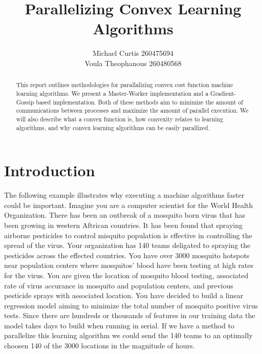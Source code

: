\documentclass{article}
\begin{document}
\title{Parallelizing Convex Learning Algorithms}
\author{Michael Curtis 260475694\\
Voula Theophanous 260480568}
\maketitle

\begin{abstract}

This report outlines methodologies for parallalizing convex cost function machine learning algorithms. We present a Master-Worker implementation and a Gradient-Gossip based implementation. Both of these methods aim to minimize the amount of communications between processes and maximize the amount of parallel execution. We will also describe what a convex function is, how convexity relates to learning algorithms, and why convex learning algorithms can be easily parallized.

\end{abstract}

\section{Introduction}
The following example illustrates why executing a machine algorithms faster could be important. Imagine you are a computer scientist for the World Health Organization. There has been an outbreak of a mosquito born virus that has been growing in western Aftrican countries. It has been found that spraying airborne pesticides to control misquito population is effective in controlling the spread of the virus. Your organization has 140 teams deligated to spraying the pesticides across the effected countries. You have over 3000 mosquito hotspots near population centers where mosquitos' blood have been testing at high rates for the virus. You are given the location of mosquito blood testing, associated rate of virus accurance in mosquito and population centers, and previous pesticide sprays with associated location. You have decided to build a linear regression model aiming to minimize the total number of mosquito positive virus tests. Since there are hundreds or thousands of features in our training data the model takes days to build when running in serial. If we have a method to parallelize this learning algorithm we could send the 140 teams to an optimally choosen 140 of the 3000 locations in the magnitude of hours.
\end{document}
